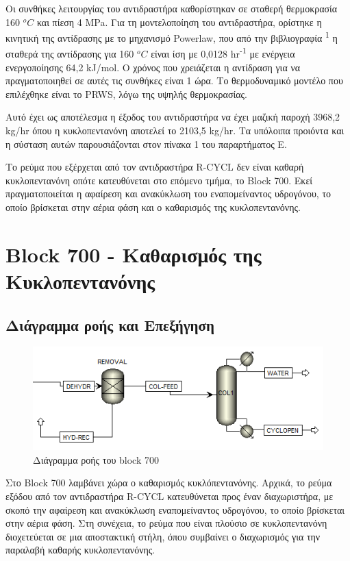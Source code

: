 \documentclass[11pt]{article}
\makeatletter
\newcommand{\citeprocitem}[2]{\hyper@linkstart{cite}{citeproc_bib_item_#1}#2\hyper@linkend}
\makeatother
\begin{document}
Οι συνθήκες λειτουργίας του αντιδραστήρα καθορίστηκαν σε σταθερή
θερμοκρασία 160 \(^oC\) και πίεση 4 MPa. Για τη μοντελοποίηση του
αντιδραστήρα, ορίστηκε η κινητική της αντίδρασης με το μηχανισμό
Powerlaw, που από την βιβλιογραφία \textsuperscript{\citeprocitem{1}{1}} η σταθερά της
αντίδρασης για 160 \(^oC\) είναι ίση με 0,0128 hr\textsuperscript{-1} με ενέργεια
ενεργοποίησης 64,2 kJ/mol. Ο χρόνος που χρειάζεται η αντίδραση για να
πραγματοποιηθεί σε αυτές τις συνθήκες είναι 1 ώρα. Το θερμοδυναμικό
μοντέλο που επιλέχθηκε είναι το PRWS, λόγω της υψηλής θερμοκρασίας.

Αυτό έχει ως αποτέλεσμα η έξοδος του αντιδραστήρα να έχει μαζική παροχή
3968,2 kg/hr όπου η κυκλοπεντανόνη αποτελεί το 2103,5 kg/hr. Τα υπόλοιπα
προιόντα και η σύσταση αυτών παρουσιάζονται στον πίνακα 1 του
παραρτήματος Ε.

Το ρεύμα που εξέρχεται από τον αντιδραστήρα R-CYCL δεν είναι καθαρή
κυκλοπεντανόνη οπότε κατευθύνεται στο επόμενο τμήμα, το Block 700. Εκεί
πραγματοποιείται η αφαίρεση και ανακύκλωση του εναπομείναντος υδρογόνου,
το οποίο βρίσκεται στην αέρια φάση και ο καθαρισμός της κυκλοπεντανόνης.

\section{Block 700 - Καθαρισμός της Κυκλοπεντανόνης}
\label{sec:org3f7c049}
\subsection{Διάγραμμα ροής και Επεξήγηση}
\label{sec:org7ddf4e3}
\begin{figure}[htbp]
\centering
\includegraphics[width=.9\linewidth]{Block_700_-_Καθαρισμός_της_Κυκλοπεντανόνης/2023-01-13_18-02-03_screenshot.png}
\caption{Διάγραμμα ροής του block 700}
\end{figure}

Στο Block 700 λαμβάνει χώρα ο καθαρισμός κυκλόπεντανόνης. Αρχικά, το
ρεύμα εξόδου από τον αντιδραστήρα R-CYCL κατευθύνεται προς έναν
διαχωριστήρα, με σκοπό την αφαίρεση και ανακύκλωση εναπομείναντος
υδρογόνου, το οποίο βρίσκεται στην αέρια φάση. Στη συνέχεια, το ρεύμα
που είναι πλούσιο σε κυκλοπεντανόνη διοχετεύεται σε μια αποστακτική
στήλη, όπου συμβαίνει ο διαχωρισμός για την παραλαβή καθαρής
κυκλοπεντανόνης.
\end{document}
